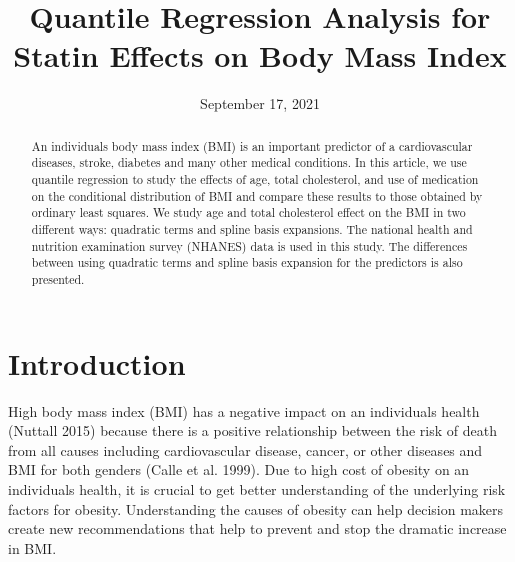 \documentclass[
  12pt,
]{article}
\title{Quantile Regression Analysis for Statin Effects on Body Mass Index}
\author{}
\date{\vspace{-2.5em}September 17, 2021}
\begin{document}
\maketitle
\begin{abstract}
An individuals body mass index (BMI) is an important predictor of a cardiovascular diseases, stroke, diabetes and many other medical conditions. In this article, we use quantile regression to study the effects of age, total cholesterol, and use of medication on the conditional distribution of BMI and compare these results to those obtained by ordinary least squares. We study age and total cholesterol effect on the BMI in two different ways: quadratic terms and spline basis expansions. The national health and nutrition examination survey (NHANES) data is used in this study. The differences between using quadratic terms and spline basis expansion for the predictors is also presented.
\end{abstract}

{
\setcounter{tocdepth}{2}
\tableofcontents
}
\newpage
\section{Introduction}

High body mass index (BMI) has a negative impact on an individuals health (Nuttall 2015) because there is a positive relationship between the risk of death from all causes including cardiovascular disease, cancer, or other diseases and BMI for both genders (Calle et al. 1999). Due to high cost of obesity on an individuals health, it is crucial to get better understanding of the underlying risk factors for obesity. Understanding the causes of obesity can help decision makers create new recommendations that help to prevent and stop the dramatic increase in BMI.
\end{document}
